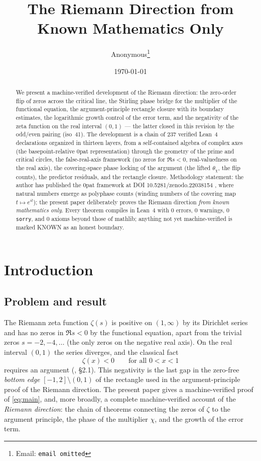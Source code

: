 \documentclass{article}
\title{The Riemann Direction from Known Mathematics Only}
\author{Anonymous\thanks{Email: \texttt{email omitted}}}
\date{\today}
\newcommand{\zt}{\zeta}
\newcommand{\Xchi}{\chi}
\begin{document}
\maketitle

\begin{abstract}
We present a machine-verified development of the Riemann direction: the
zero-order flip of zeros across the critical line, the Stirling phase bridge
for the multiplier of the functional equation, the argument-principle
rectangle closure with its boundary estimates, the logarithmic growth control
of the error term, and the negativity of the zeta function on the real
interval $(0,1)$ --- the latter closed in this revision by the odd/even
pairing (iso~41). The development is a chain of 237 verified Lean~4
declarations organized in thirteen layers, from a self-contained algebra of
complex axes (the basepoint-relative 0pat representation) through the
geometry of the prime and critical circles, the false-real-axis framework (no
zeros for $\Re s<0$, real-valuedness on the real axis), the covering-space
phase locking of the argument (the lifted $\theta_\Xchi$, the flip counts),
the predictor residuals, and the rectangle closure. Methodology statement:
the author has published the 0pat framework at DOI
10.5281/zenodo.22038154 \cite{zenodo}, where natural numbers emerge as polyphase counts
(winding numbers of the covering map $t\mapsto e^{it}$); the present paper
deliberately proves the Riemann direction \emph{from known mathematics only}.
Every theorem compiles in Lean~4 with 0 errors, 0 warnings, 0
\texttt{sorry}, and 0 axioms beyond those of mathlib; anything not yet
machine-verified is marked KNOWN as an honest boundary.
\end{abstract}

\section{Introduction}
\label{sec:intro}

\subsection{Problem and result}
\label{sec:problem}

The Riemann zeta function $\zt(s)$ is positive on $(1,\infty)$ by its
Dirichlet series and has no zeros in $\Re s<0$ by the functional equation,
apart from the trivial zeros $s=-2,-4,\dots$ (the only zeros on the
negative real axis). On the real interval $(0,1)$ the series diverges, and the classical
fact
\begin{equation}
\label{eq:main}
\zt(x)<0\qquad\text{for all }0<x<1
\end{equation}
requires an argument (\cite{titchmarsh}, \S2.1). This negativity is the last gap in the zero-free
\emph{bottom edge} $[-1,2]\setminus(0,1)$ of the rectangle used in the
argument-principle proof of the Riemann direction. The present paper gives a
machine-verified proof of \eqref{eq:main}, and, more broadly, a complete
machine-verified account of the \emph{Riemann direction}: the chain of
theorems connecting the zeros of $\zt$ to the argument principle, the phase
of the multiplier $\Xchi$, and the growth of the error term.
\end{document}
